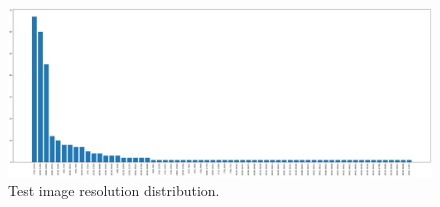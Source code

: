 \begin{figure}[htb!]
  \centering
  \includegraphics[width=\textwidth]{assets/test_image_resolutions.pdf}
  \caption{Test image resolution distribution.}
  \label{figure:3}
\end{figure}
